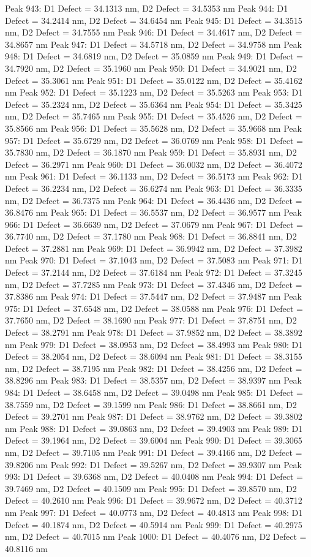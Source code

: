 \documentclass{article}
\begin{document}
Peak 943: D1 Defect = 34.1313 nm, D2 Defect = 34.5353 nm
Peak 944: D1 Defect = 34.2414 nm, D2 Defect = 34.6454 nm
Peak 945: D1 Defect = 34.3515 nm, D2 Defect = 34.7555 nm
Peak 946: D1 Defect = 34.4617 nm, D2 Defect = 34.8657 nm
Peak 947: D1 Defect = 34.5718 nm, D2 Defect = 34.9758 nm
Peak 948: D1 Defect = 34.6819 nm, D2 Defect = 35.0859 nm
Peak 949: D1 Defect = 34.7920 nm, D2 Defect = 35.1960 nm
Peak 950: D1 Defect = 34.9021 nm, D2 Defect = 35.3061 nm
Peak 951: D1 Defect = 35.0122 nm, D2 Defect = 35.4162 nm
Peak 952: D1 Defect = 35.1223 nm, D2 Defect = 35.5263 nm
Peak 953: D1 Defect = 35.2324 nm, D2 Defect = 35.6364 nm
Peak 954: D1 Defect = 35.3425 nm, D2 Defect = 35.7465 nm
Peak 955: D1 Defect = 35.4526 nm, D2 Defect = 35.8566 nm
Peak 956: D1 Defect = 35.5628 nm, D2 Defect = 35.9668 nm
Peak 957: D1 Defect = 35.6729 nm, D2 Defect = 36.0769 nm
Peak 958: D1 Defect = 35.7830 nm, D2 Defect = 36.1870 nm
Peak 959: D1 Defect = 35.8931 nm, D2 Defect = 36.2971 nm
Peak 960: D1 Defect = 36.0032 nm, D2 Defect = 36.4072 nm
Peak 961: D1 Defect = 36.1133 nm, D2 Defect = 36.5173 nm
Peak 962: D1 Defect = 36.2234 nm, D2 Defect = 36.6274 nm
Peak 963: D1 Defect = 36.3335 nm, D2 Defect = 36.7375 nm
Peak 964: D1 Defect = 36.4436 nm, D2 Defect = 36.8476 nm
Peak 965: D1 Defect = 36.5537 nm, D2 Defect = 36.9577 nm
Peak 966: D1 Defect = 36.6639 nm, D2 Defect = 37.0679 nm
Peak 967: D1 Defect = 36.7740 nm, D2 Defect = 37.1780 nm
Peak 968: D1 Defect = 36.8841 nm, D2 Defect = 37.2881 nm
Peak 969: D1 Defect = 36.9942 nm, D2 Defect = 37.3982 nm
Peak 970: D1 Defect = 37.1043 nm, D2 Defect = 37.5083 nm
Peak 971: D1 Defect = 37.2144 nm, D2 Defect = 37.6184 nm
Peak 972: D1 Defect = 37.3245 nm, D2 Defect = 37.7285 nm
Peak 973: D1 Defect = 37.4346 nm, D2 Defect = 37.8386 nm
Peak 974: D1 Defect = 37.5447 nm, D2 Defect = 37.9487 nm
Peak 975: D1 Defect = 37.6548 nm, D2 Defect = 38.0588 nm
Peak 976: D1 Defect = 37.7650 nm, D2 Defect = 38.1690 nm
Peak 977: D1 Defect = 37.8751 nm, D2 Defect = 38.2791 nm
Peak 978: D1 Defect = 37.9852 nm, D2 Defect = 38.3892 nm
Peak 979: D1 Defect = 38.0953 nm, D2 Defect = 38.4993 nm
Peak 980: D1 Defect = 38.2054 nm, D2 Defect = 38.6094 nm
Peak 981: D1 Defect = 38.3155 nm, D2 Defect = 38.7195 nm
Peak 982: D1 Defect = 38.4256 nm, D2 Defect = 38.8296 nm
Peak 983: D1 Defect = 38.5357 nm, D2 Defect = 38.9397 nm
Peak 984: D1 Defect = 38.6458 nm, D2 Defect = 39.0498 nm
Peak 985: D1 Defect = 38.7559 nm, D2 Defect = 39.1599 nm
Peak 986: D1 Defect = 38.8661 nm, D2 Defect = 39.2701 nm
Peak 987: D1 Defect = 38.9762 nm, D2 Defect = 39.3802 nm
Peak 988: D1 Defect = 39.0863 nm, D2 Defect = 39.4903 nm
Peak 989: D1 Defect = 39.1964 nm, D2 Defect = 39.6004 nm
Peak 990: D1 Defect = 39.3065 nm, D2 Defect = 39.7105 nm
Peak 991: D1 Defect = 39.4166 nm, D2 Defect = 39.8206 nm
Peak 992: D1 Defect = 39.5267 nm, D2 Defect = 39.9307 nm
Peak 993: D1 Defect = 39.6368 nm, D2 Defect = 40.0408 nm
Peak 994: D1 Defect = 39.7469 nm, D2 Defect = 40.1509 nm
Peak 995: D1 Defect = 39.8570 nm, D2 Defect = 40.2610 nm
Peak 996: D1 Defect = 39.9672 nm, D2 Defect = 40.3712 nm
Peak 997: D1 Defect = 40.0773 nm, D2 Defect = 40.4813 nm
Peak 998: D1 Defect = 40.1874 nm, D2 Defect = 40.5914 nm
Peak 999: D1 Defect = 40.2975 nm, D2 Defect = 40.7015 nm
Peak 1000: D1 Defect = 40.4076 nm, D2 Defect = 40.8116 nm
\end{document}
